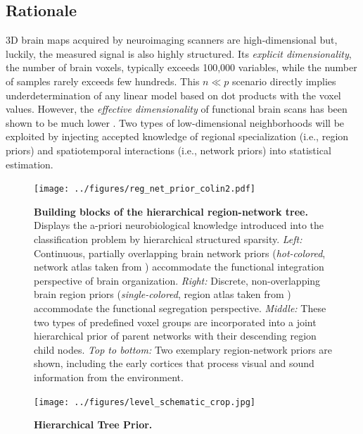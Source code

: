 \documentclass[runningheads,a4paper]{llncs}
\begin{document}
\subsection{Rationale}
3D brain maps acquired by neuroimaging
scanners are high-dimensional but, luckily,
the measured signal is also highly structured.
Its \textit{explicit dimensionality}, the number of brain voxels,
typically exceeds 100,000 variables, while the number
of samples rarely exceeds few hundreds.
This $n \ll p$ scenario directly implies underdetermination of any
linear model based on dot products with the voxel values.
However, the \textit{effective dimensionality} of functional brain scans has been
shown to be much lower \cite{bzdok2015semi}.
Two types of low-dimensional neighborhoods will be exploited by
injecting accepted knowledge of regional specialization
(i.e., region priors)
and spatiotemporal interactions
(i.e., network priors)
into statistical estimation.
\begin{figure}
  \vspace{-0.6cm}
  \centering
  \texttt{[image: ../figures/reg\_net\_prior\_colin2.pdf]}
  \vspace{-0.3cm}
  \caption{\textbf{Building blocks of the hierarchical region-network tree.}
  Displays the a-priori neurobiological knowledge
  introduced into the classification problem 
  by hierarchical structured sparsity.
  \textit{Left:} Continuous, partially overlapping brain network priors
  (\textit{hot-colored}, network atlas taken from \cite{smith2009})
  accommodate the functional integration
  perspective of brain organization.
  \textit{Right:} Discrete, non-overlapping brain region priors
  (\textit{single-colored}, region atlas taken from \cite{crad12})
  accommodate the functional segregation perspective.
  \textit{Middle:} These two types of predefined voxel groups are incorporated
  into a joint hierarchical prior of parent networks with their
  descending region child nodes.
  \textit{Top to bottom:} Two exemplary region-network priors
  are shown, including
  the early cortices that process
  visual and sound information from the environment.
  }
  \vspace{-0.6cm}
  \label{fig_priors}
\end{figure}
%
\begin{figure}
\begin{centering}
\texttt{[image: ../figures/level\_schematic\_crop.jpg]}
\end{centering}
\vspace{-0.7cm}
  \caption{\textbf{Hierarchical Tree Prior.}
  }
\label{fig_prior_penalty}
\end{figure}
\end{document}
